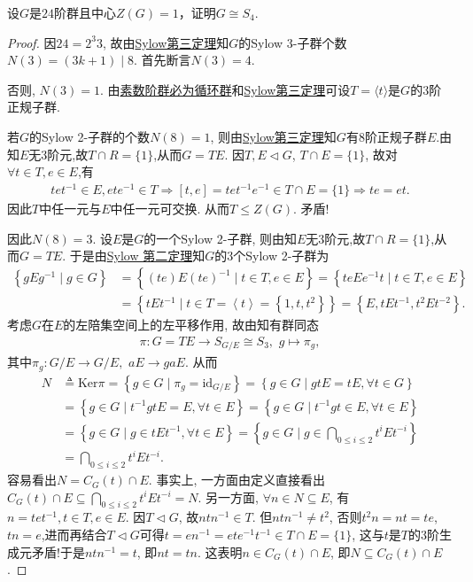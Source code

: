 \documentclass[../../main.tex]{subfiles}%
\begin{document}
\begin{example}
设$G$是$24$阶群且中心$Z(G)=1$，证明$G \cong S_4$.
\end{example}
\begin{proof}
因$24=2^3 3$, 故由\hyperref[theorem:Sylow第三定理]{Sylow第三定理}知$G$的Sylow 3-子群个数$N(3)=(3k+1) \mid 8$. 首先断言$N(3)=4$.

否则, $N(3)=1$. 由\hyperref[proposition:素数阶群必为循环群]{素数阶群必为循环群}和\hyperref[theorem:Sylow第三定理]{Sylow第三定理}可设$T=\langle t \rangle$是$G$的$3$阶正规子群.

若$G$的Sylow 2-子群的个数$N(8)=1$, 则由\hyperref[theorem:Sylow第三定理]{Sylow第三定理}知$G$有$8$阶正规子群$E$.由知$E$无3阶元,故$T\cap R=\{1\}$,从而$G=TE$. 因$T,E \lhd G$, $T \cap E=\{1\}$, 故对$\forall t\in T,e\in E$,有
\begin{align*}
tet^{-1}\in E,ete^{-1}\in T\Longrightarrow[t,e]=tet^{-1}e^{-1}\in T\cap E=\{1\}\Longrightarrow te=et.
\end{align*}
因此$T$中任一元与$E$中任一元可交换. 从而$T \leqslant Z(G)$. 矛盾!

因此$N(8)=3$. 设$E$是$G$的一个Sylow 2-子群, 则由知$E$无3阶元,故$T\cap R=\{1\}$,从而$G=TE$. 于是由\hyperref[theorem:Sylow 第二定理]{Sylow 第二定理}知$G$的$3$个Sylow 2-子群为
\begin{align*}
\left\{ gEg^{-1}\mid g\in G \right\} &=\left\{ \left( te \right) E\left( te \right) ^{-1}\mid t\in T,e\in E \right\} =\left\{ teEe^{-1}t\mid t\in T,e\in E \right\} 
\\
&=\left\{ tEt^{-1}\mid t\in T=\left< t \right> =\left\{ 1,t,t^2 \right\} \right\} =\left\{ E,tEt^{-1},t^2Et^{-2} \right\} .
\end{align*}
考虑$G$在$E$的左陪集空间上的左平移作用, 故由知有群同态
\begin{align*}
\pi: G=TE \to S_{G/E} \cong S_3,\,\,g\mapsto \pi_g,
\end{align*}
其中$\pi_g:G/E\to G/E,\,\,aE\to gaE$.
从而
\begin{align*}
N&\triangleq \mathrm{Ker}\pi =\left\{ g\in G\mid \pi _g=\mathrm{id}_{G/E} \right\} =\left\{ g\in G\mid gtE=tE,\forall t\in G \right\} 
\\
&=\left\{ g\in G\mid t^{-1}gtE=E,\forall t\in E \right\} =\left\{ g\in G\mid t^{-1}gt\in E,\forall t\in E \right\} 
\\
&=\left\{ g\in G\mid g\in tEt^{-1},\forall t\in E \right\} =\left\{ g\in G\mid g\in \bigcap_{0\leqslant i\leqslant 2}{t^iEt^{-i}} \right\} 
\\
&=\bigcap_{0\leqslant i\leqslant 2}{t^iEt^{-i}}.
\end{align*}
容易看出$N = C_G(t) \cap E$. 事实上, 一方面由定义直接看出$C_G(t) \cap E \subseteq \bigcap\limits_{0 \leqslant i \leqslant 2} t^i E t^{-i} = N$. 另一方面, $\forall n \in N\subseteq E$, 有$n = tet^{-1}, t\in T,e \in E$. 因$T \lhd G$, 故$ntn^{-1} \in T$. 但$ntn^{-1} \neq t^2$, 否则$t^2 n = nt = te$, $tn = e$,进而再结合$T\lhd G$可得$t=en^{-1}=ete^{-1}t^{-1}\in T\cap E=\{1\}$, 这与$t$是$T$的3阶生成元矛盾!于是$ntn^{-1} = t$, 即$nt = tn$. 这表明$n \in C_G(t) \cap E$, 即$N \subseteq C_G(t) \cap E$.


\end{proof}
\end{document}
